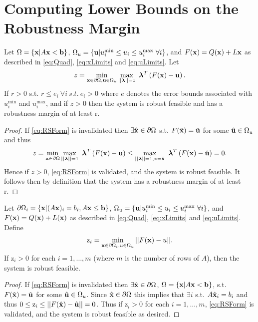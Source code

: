 \section{Computing Lower Bounds on the Robustness Margin} \label{sec:inbdform}  

\begin{thm}
Let $\Omega=\{\mathbf{x}| A\mathbf{x}< \mathbf{b}\}$, $\Omega_{u}=\{\mathbf{u}| u^{\min}_i\leq u_i \leq u^{\max}_i \ \forall i \}$, and $F(\mathbf{x})=Q(\mathbf{x})+L\mathbf{x}$ as described in \cref{eq:Quad}, \cref{eq:xLimits} and \cref{eq:uLimits}. 
Let
$$z = \min\limits_{\vx\in \partial \Omega, \vu\in \Omega_{u} }\max\limits_{||\boldsymbol{\lambda}||=1}\ \boldsymbol{\lambda}^T\left(F(\vx)-\vu\right).$$
If $r>0$ s.t. $r\leq e_i \ \forall i \ s.t. \ e_i>0$ where $e$ denotes the error bounds associated with $ u^{\min}_i$ and $ u^{\max}_i$, and if $z>0$ then the system is robust feasible and has a robustness margin of at least r.

\begin{proof} 
If \cref{eq:RSForm} is invalidated then $\exists \hat{\mathbf{x}}\in\partial\Omega$ s.t. $F(\hat{\mathbf{x}})=\hat{\mathbf{u}}$ for some $\hat{\mathbf{u}}\in\Omega_{u}$ and thus $$z = \min\limits_{\vx\in \partial \Omega}\max\limits_{||\boldsymbol{\lambda}||=1}\ \boldsymbol{\lambda}^T\left(F(\vx)-\vu\right)\leq \max\limits_{||\boldsymbol{\lambda}||=1, \vx=\hat{\vx}}\ \boldsymbol{\lambda}^T\left(F(\vx)-\hat{\vu}\right)=0.$$ 
Hence if $z>0$, \cref{eq:RSForm} is validated, and the system is robust feasible. It follows then by definition that the system has a robustness margin of at least r.
\end{proof}
\end{thm}

\begin{thm} \label{thm:RobFeas}
Let $\partial\Omega_i=\{\mathbf{x}| (A\mathbf{x})_i = b_i, A\mathbf{x}\leq \mathbf{b}\}$, $\Omega_{u}=\{\mathbf{u}| u^{\min}_i\leq u_i \leq u^{\max}_i \ \forall i \}$, and $F(\mathbf{x})=Q(\mathbf{x})+L(\mathbf{x})$ as described in \cref{eq:Quad}, \cref{eq:xLimits} and \cref{eq:uLimits}. Define
\begin{align}
\mathrm{z}_i =  \min_{\mathbf{x}\in\partial\Omega_i, u\in \Omega_u} ||F(\mathbf{x})-u||. \label{eq:OPTfeas}
\end{align}
If $\mathrm{z}_i>0$ for each $i = 1, \ldots, m$ (where $m$ is the number of rows of $A$), then the system is robust feasible.

\begin{proof} 
If \cref{eq:RSForm} is invalidated then $\exists \hat{\mathbf{x}}\in\partial\Omega$, $\Omega=\{\mathbf{x}| A\mathbf{x}< \mathbf{b}\}$, s.t. $F(\hat{\mathbf{x}})=\hat{\mathbf{u}}$ for some $\hat{\mathbf{u}}\in \Omega_u$. 
Since $\hat{\mathbf{x}}\in\partial\Omega$ this implies that $\exists i$ s.t. $A\hat{\mathbf{x}}_i=b_i$ and thus $0\leq \mathrm{z}_i \leq ||F(\hat{\mathbf{x}})-\hat{\mathbf{u}}||=0$.
Thus if $\mathrm{z}_i>0$ for each $i = 1, \ldots, m$, \cref{eq:RSForm} is validated, and the system is robust feasible as desired.
\end{proof}
\end{thm}

